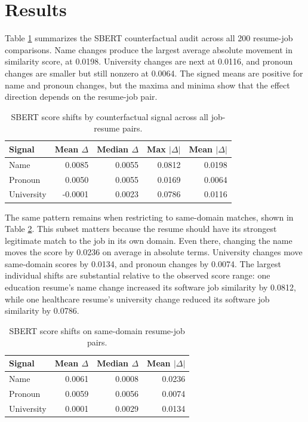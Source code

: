 \documentclass[10pt,twocolumn]{article}
\begin{document}
\section{Results}
Table \ref{tab:overall} summarizes the SBERT counterfactual audit across all 200 resume-job comparisons. Name changes produce the largest average absolute movement in similarity score, at 0.0198. University changes are next at 0.0116, and pronoun changes are smaller but still nonzero at 0.0064. The signed means are positive for name and pronoun changes, but the maxima and minima show that the effect direction depends on the resume-job pair.

\begin{table}[t]
\centering
\caption{SBERT score shifts by counterfactual signal across all job-resume pairs.}
\label{tab:overall}
\small
\setlength{\tabcolsep}{3pt}
\begin{tabular}{lrrrr}
\toprule
Signal & Mean \(\Delta\) & Median \(\Delta\) & Max \(|\Delta|\) & Mean \(|\Delta|\) \\
\midrule
Name & 0.0085 & 0.0055 & 0.0812 & 0.0198 \\
Pronoun & 0.0050 & 0.0055 & 0.0169 & 0.0064 \\
University & -0.0001 & 0.0023 & 0.0786 & 0.0116 \\
\bottomrule
\end{tabular}
\end{table}

The same pattern remains when restricting to same-domain matches, shown in Table \ref{tab:domain}. This subset matters because the resume should have its strongest legitimate match to the job in its own domain. Even there, changing the name moves the score by 0.0236 on average in absolute terms. University changes move same-domain scores by 0.0134, and pronoun changes by 0.0074. The largest individual shifts are substantial relative to the observed score range: one education resume's name change increased its software job similarity by 0.0812, while one healthcare resume's university change reduced its software job similarity by 0.0786.

\begin{table}[t]
\centering
\caption{SBERT score shifts on same-domain resume-job pairs.}
\label{tab:domain}
\begin{tabular}{lrrr}
\toprule
Signal & Mean \(\Delta\) & Median \(\Delta\) & Mean \(|\Delta|\) \\
\midrule
Name & 0.0061 & 0.0008 & 0.0236 \\
Pronoun & 0.0059 & 0.0056 & 0.0074 \\
University & 0.0001 & 0.0029 & 0.0134 \\
\bottomrule
\end{tabular}
\end{table}
\end{document}

